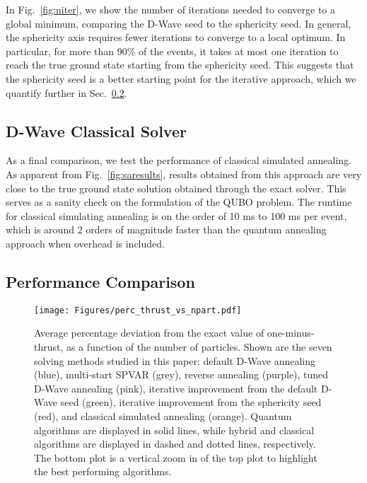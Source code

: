 \documentclass[aps,prd,twocolumn,superscriptaddress,preprintnumbers,nofootinbib,longbibliography,floatfix]{revtex4-1}
\DeclareRobustCommand{\Sec}[1]{Sec.~\ref{sec:#1}}
\DeclareRobustCommand{\Fig}[1]{Fig.~\ref{fig:#1}}
\begin{document}
In \Fig{niter}, we show the number of iterations needed to converge to a global minimum, comparing the D-Wave seed to the sphericity seed.
%
In general, the sphericity axis requires fewer iterations to converge to a local optimum.
%
In particular, for more than 90\% of the events, it takes at most one iteration to reach the true ground state starting from the sphericity seed. 
%
This suggests that the sphericity seed is a better starting point for the iterative approach, which we quantify further in \Sec{final_comparison}.



\subsection{D-Wave Classical Solver}
\label{sec:classical_results}

As a final comparison, we test the performance of classical simulated annealing.
%
As apparent from \Fig{saresults}, results obtained from this approach are very close to the true ground state solution obtained through the exact solver.
%
This serves as a sanity check on the formulation of the QUBO problem.
%
The runtime for classical simulating annealing is on the order of 10 ms to 100 ms per event, which is around 2 orders of magnitude faster than the quantum annealing approach when overhead is included.





\subsection{Performance Comparison}
\label{sec:final_comparison}

\begin{figure*}[p]
    \centering
    \texttt{[image: Figures/perc\_thrust\_vs\_npart.pdf]}
    \caption{
    Average percentage deviation from the exact value of
    one-minus-thrust, as a function of the number of particles.
    Shown are the seven solving methods studied in this paper:  default D-Wave annealing (blue), multi-start SPVAR (grey), reverse annealing (purple), tuned D-Wave annealing (pink), iterative improvement from the default D-Wave seed (green), iterative improvement from the sphericity seed (red), and classical simulated annealing (orange).
    Quantum algorithms are displayed in solid lines, while hybrid and classical algorithms are displayed in dashed and dotted lines, respectively.
    The bottom plot is a vertical zoom in of the top plot to highlight the best performing algorithms.
    }
    \label{fig:npart}
\end{figure*}
\end{document}
